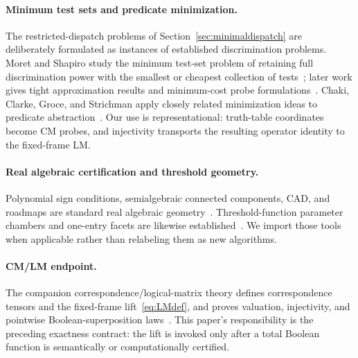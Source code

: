 \documentclass[11pt]{article}
\theoremstyle{definition}
\theoremstyle{remark}
\begin{document}
\paragraph{Minimum test sets and predicate minimization.}
The restricted-dispatch problems of Section~\ref{sec:minimaldispatch} are deliberately formulated as instances of established discrimination problems. Moret and Shapiro study the minimum test-set problem of retaining full discrimination power with the smallest or cheapest collection of tests~\cite{MoretShapiro1985}; later work gives tight approximation results and minimum-cost probe formulations~\cite{BermanDasGuptaKao2005}. Chaki, Clarke, Groce, and Strichman apply closely related minimization ideas to predicate abstraction~\cite{ChakiEtAl2003}. Our use is representational: truth-table coordinates become CM probes, and injectivity transports the resulting operator identity to the fixed-frame LM.

\paragraph{Real algebraic certification and threshold geometry.}
Polynomial sign conditions, semialgebraic connected components, CAD, and roadmaps are standard real algebraic geometry~\cite{BasuPollackRoy2006}. Threshold-function parameter chambers and one-entry facets are likewise established~\cite{Anthony2026}. We import those tools when applicable rather than relabeling them as new algorithms.

\paragraph{CM/LM endpoint.}
The companion correspondence/logical-matrix theory defines correspondence tensors and the fixed-frame lift~\eqref{eq:LMdef}, and proves valuation, injectivity, and pointwise Boolean-superposition laws~\cite{TheoryCMLM2026}. This paper's responsibility is the preceding exactness contract: the lift is invoked only after a total Boolean function is semantically or computationally certified.
\end{document}

